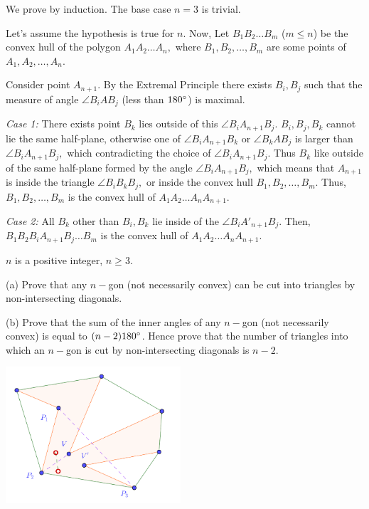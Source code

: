 \documentclass{article}
\begin{document}
\begin{soln}
    We prove by induction. The base case $n=3$ is trivial.

    Let's assume the hypothesis is true for $n.$ Now, Let $B_1 B_2 \ldots B_m$ ($m \le n$) be the convex hull of the polygon $A_1 A_2 \ldots A_n,$
    where $B_1, B_2, \ldots, B_m$ are some points of $A_1, A_2, \ldots, A_n.$
    
    Consider point $A_{n+1}.$ By the Extremal Principle there exists $B_i, B_j$ such that the measure of angle $\angle B_i A B_j$ (less than $180^\circ$) is maximal.
    
    \textit{Case 1:} There exists point $B_k$ lies outside of this $\angle B_i A_{n+1} B_j.$
    $B_i, B_j, B_k$ cannot lie the same half-plane, otherwise one of $\angle B_i A_{n+1} B_k$ or $\angle B_k A B_j$ is larger than $\angle B_i A_{n+1} B_j,$
    which contradicting the choice of $\angle B_i A_{n+1} B_j.$ Thus $B_k$ like outside of the same half-plane formed by the angle $\angle B_i A_{n+1} B_j,$
    which means that $A_{n+1}$ is inside the triangle $\angle B_i B_k B_j,$ or inside the convex hull $B_1, B_2, \ldots, B_m.$
    Thus, $B_1, B_2, \ldots, B_m$ is the convex hull of $A_1 A_2 \ldots A_n A_{n+1}.$
    
    \textit{Case 2:} All $B_k$ other than $B_i, B_k$ lie inside of the $\angle B_i A'_{n+1} B_j.$
    Then, $B_1 B_2 B_i A_{n+1} B_j \ldots B_m$ is the convex hull of $A_1 A_2 \ldots A_n A_{n+1}.$
\end{soln}

\begin{problem}
    $n$ is a positive integer, $n \ge 3.$

    (a) Prove that any $n-$gon (not necessarily convex) can be cut into triangles by non-intersecting diagonals.

    (b) Prove that the sum of the inner angles of any $n-$gon (not necessarily convex) is equal to $(n-2)180^\circ$.
    Hence prove that the number of triangles into which an $n-$gon is cut by non-intersecting diagonals is $n-2.$
\end{problem}

\begin{center}
    \includegraphics[width=6.5cm]{./svg/pdf/23-24-s5-o-p31.pdf}
\end{center}
\end{document}
